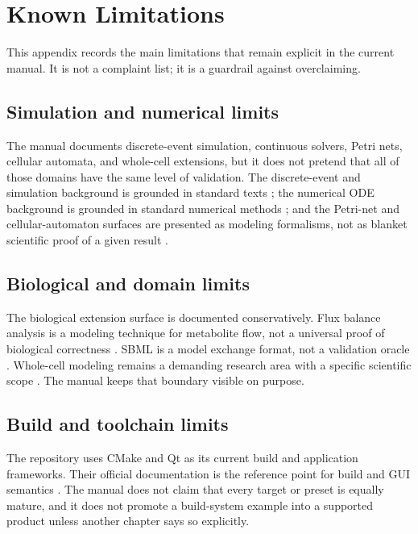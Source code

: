 \chapter{Known Limitations}
\label{chap:appendix-known-limitations}

This appendix records the main limitations that remain explicit in the current
manual. It is not a complaint list; it is a guardrail against overclaiming.

\section{Simulation and numerical limits}

The manual documents discrete-event simulation, continuous solvers, Petri
nets, cellular automata, and whole-cell extensions, but it does not pretend
that all of those domains have the same level of validation. The discrete-event
and simulation background is grounded in standard texts \cite{banks2005,law2015};
the numerical ODE background is grounded in standard numerical methods
\cite{hairer1993}; and the Petri-net and cellular-automaton surfaces are
presented as modeling formalisms, not as blanket scientific proof of a given
result \cite{murata1989,wolfram2002}.

\section{Biological and domain limits}

The biological extension surface is documented conservatively. Flux balance
analysis is a modeling technique for metabolite flow, not a universal proof of
biological correctness \cite{orth2010}. SBML is a model exchange format, not a
validation oracle \cite{hucka2003}. Whole-cell modeling remains a demanding
research area with a specific scientific scope \cite{karr2012}. The manual
keeps that boundary visible on purpose.

\section{Build and toolchain limits}

The repository uses CMake and Qt as its current build and application
frameworks. Their official documentation is the reference point for build and
GUI semantics \cite{cmake-docs,qt-docs}. The manual does not claim that every
target or preset is equally mature, and it does not promote a build-system
example into a supported product unless another chapter says so explicitly.

